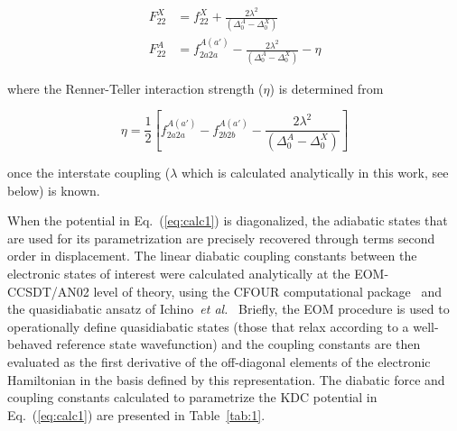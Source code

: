 \documentclass[journal=jpcafh,manuscript=article,layout=onecolumn, 12pt]{achemso}
\begin{document}
\begin{align}
F_{22}^X &= f_{22}^X+\frac{2\lambda^2}{(\Delta_0^A-\Delta_0^X)}\\
F_{22}^A &= f_{2a2a}^{A(a')}-\frac{2\lambda^2}{(\Delta_0^A-\Delta_0^X)}-\eta
\label{eq:calc2}
\end{align}

where the Renner-Teller interaction strength ($\eta$) is determined from 

\begin{equation}
\eta = \frac{1}{2}\left[ f_{2a2a}^{A(a')}-f_{2b2b}^{A(a')}-\frac{2\lambda^2}{(\Delta_0^A-\Delta_0^X)}\right]
\label{eq:calc3}
\end{equation}

once the interstate coupling ($\lambda$ which is calculated analytically in this work, see below) is known.

When the potential in Eq.~(\ref{eq:calc1}) is diagonalized, the adiabatic states that are used for its parametrization are precisely recovered through terms second order in displacement. The linear diabatic coupling constants between the electronic states of interest were calculated analytically at the EOM-CCSDT/AN02 level of theory, using the CFOUR computational package~\cite{dev20} and the quasidiabatic ansatz of Ichino~\emph{et al.}~\cite{ich09} Briefly, the EOM procedure is used to operationally define quasidiabatic states (those that relax according to a well-behaved reference state wavefunction) and the coupling constants are then evaluated as the first derivative of the off-diagonal elements of the electronic Hamiltonian in the basis defined by this representation. The diabatic force and coupling constants calculated to parametrize the KDC potential in Eq.~(\ref{eq:calc1}) are presented in Table~\ref{tab:1}.


\end{document}
